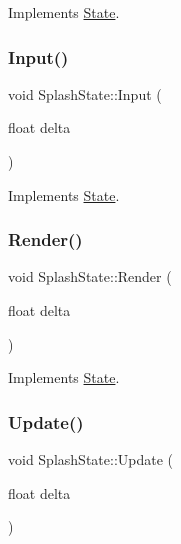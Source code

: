 Implements \hyperlink{classState_a7ab4d8c6aa239a17ed579d89a209b156}{State}.

\mbox{\label{classSplashState_adb2eb87bd89e41af0c3a9d0903e89450}} 
\subsubsection{\texorpdfstring{Input()}{Input()}}
{\footnotesize\ttfamily void Splash\+State\+::\+Input (\begin{DoxyParamCaption}\item[{float}]{delta }\end{DoxyParamCaption})\hspace{0.3cm}{\ttfamily [virtual]}}



Implements \hyperlink{classState_a1705412877f37a5cc8fc712542756076}{State}.

\mbox{\label{classSplashState_a5efb6f0ede61ec76ee2dd72a6b24c57c}} 
\subsubsection{\texorpdfstring{Render()}{Render()}}
{\footnotesize\ttfamily void Splash\+State\+::\+Render (\begin{DoxyParamCaption}\item[{float}]{delta }\end{DoxyParamCaption})\hspace{0.3cm}{\ttfamily [virtual]}}



Implements \hyperlink{classState_a0e48dfae1e3090630475812681417c5f}{State}.

\mbox{\label{classSplashState_af19b293ae1e914e13db4382115e56d2c}} 
\subsubsection{\texorpdfstring{Update()}{Update()}}
{\footnotesize\ttfamily void Splash\+State\+::\+Update (\begin{DoxyParamCaption}\item[{float}]{delta }\end{DoxyParamCaption})\hspace{0.3cm}{\ttfamily [virtual]}}



